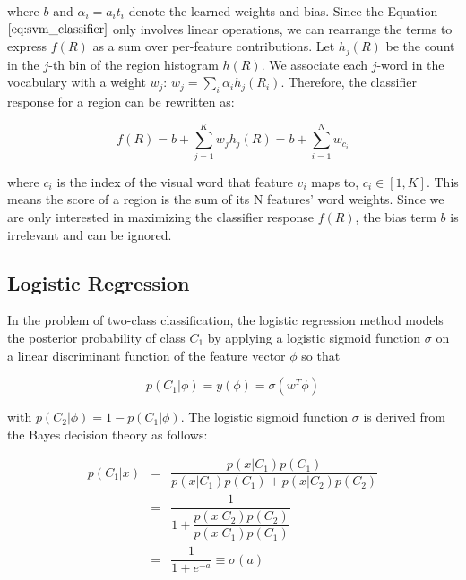 \documentclass{SMBV12}
\begin{document}
where $b$ and $\alpha_i = a_i t_i$ denote the learned weights and bias. Since the Equation $\ref{eq:svm_classifier}$ only involves linear operations, we can rearrange the terms to express $f(R)$ as a sum over per-feature contributions. Let $h_j(R)$ be the count in the $j$-th bin of the region histogram $h(R)$. We associate each $j$-word in the vocabulary with a weight $w_j$: $w_j = \sum_i \alpha_i h_j(R_i)$. Therefore, the classifier response for a region can be rewritten as:

\begin{equation}
f(R) = b + \sum\limits_{j = 1}^{K} w_j h_j(R) = b + \sum\limits_{i = 1}^{N}w_{c_i}
\end{equation}

where $c_i$ is the index of the visual word that feature $v_i$ maps to, $c_i \in [1, K]$. This means the score of a region is the sum of its N features' word weights. Since we are only interested in maximizing the classifier response $f(R)$, the bias term $b$ is irrelevant and can be ignored.

\subsection{Logistic Regression}

\label{sec:logistic_regression}

In the problem of two-class classification, the logistic regression method models the posterior probability of class $C_1$ by applying a logistic sigmoid function $\sigma$ on a linear discriminant function of the feature vector $\phi$ so that

\begin{equation}
\label{eq:logistic}
p(C_1|\phi) = y(\phi) = \sigma(w^T\phi)
\end{equation}

with $p(C_2|\phi) = 1 - p(C_1|\phi)$. The logistic sigmoid function $\sigma$ is derived from the Bayes decision theory as follows:

\begin{equation}
\label{eq:Bayes}
\begin{array}{lcl}
p(C_1|x) & = & \dfrac{p(x|C_1)p(C_1)}{p(x|C_1)p(C_1) + p(x|C_2)p(C_2)}\\
		 & = & \dfrac{1}{1 + \dfrac{p(x|C_2)p(C_2)}{p(x|C_1)p(C_1)}}\\
		 & = & \dfrac{1}{1 + e^{-a}} \equiv \sigma(a)
\end{array}
\end{equation}
\end{document}
